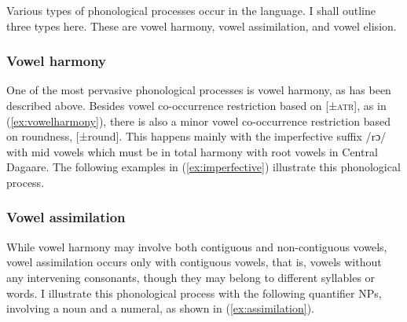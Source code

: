Various types of phonological processes occur in the language. I shall
outline three types here. These are vowel harmony, vowel assimilation, and vowel elision.

\subsubsection{Vowel harmony}
One of the most pervasive phonological processes is vowel harmony, as has been
described above. Besides vowel co-occurrence restriction based on [±\textsc{atr}], as in (\ref{ex:vowelharmony}), there is
also a minor vowel co-occurrence restriction based on roundness, [±round]. This happens
mainly with the imperfective suffix /rɔ/ with mid vowels which must be in total harmony
with root vowels in Central Dagaare. The following examples in (\ref{ex:imperfective}) illustrate this
phonological process.




\subsubsection{Vowel assimilation}
While vowel harmony may involve both contiguous and non-contiguous vowels,
vowel assimilation occurs only with contiguous vowels, that is, vowels without any intervening consonants, though they may belong to different syllables or words. I illustrate this phonological process with the following quantifier NPs, involving a noun and a numeral, as shown in (\ref{ex:assimilation}).

\ea \label{ex:assimilation} 
\z\z 







